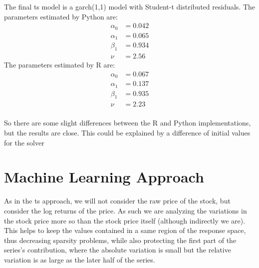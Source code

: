 The final \acrshort{ts} model is a \acrshort{garch}(1,1) model with Student-t distributed residuals. The parameters estimated by Python are:
\begin{align*}
\alpha_0 &= 0.042 \\
\alpha_1 &= 0.065 \\
\beta_1 &= 0.934 \\
\nu &= 2.56
\end{align*}
The parameters estimated by R are:
\begin{align*}
\alpha_0 &= 0.067 \\
\alpha_1 &= 0.137 \\
\beta_1 &= 0.935 \\
\nu &= 2.23 \\
\end{align*}

So there are some slight differences between the R and Python implementations, but the results are close. This could be explained by a difference of initial values for the solver


\section{Machine Learning Approach}
As in the \acrshort{ts} approach, we will not consider the raw price of the stock, but consider the log returns of the price. As such we are analyzing the variations in the stock price more so than the stock price itself (although indirectly we are). This helps to keep the values contained in a same region of the response space, thus decreasing sparsity problems, while also protecting the first part of the series's contribution, where the absolute variation is small but the relative variation is as large as the later half of the series.

